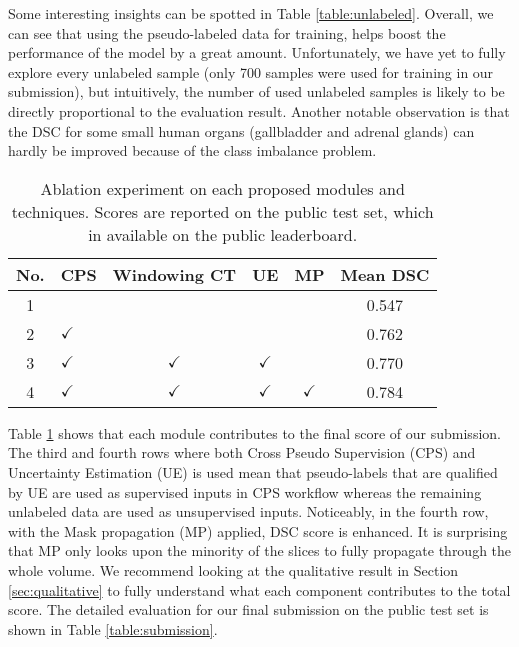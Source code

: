 Some interesting insights can be spotted in Table \ref{table:unlabeled}. Overall, we can see that using the pseudo-labeled data for training, helps boost the performance of the model by a great amount. Unfortunately, we have yet to fully explore every unlabeled sample (only 700 samples were used for training in our submission), but intuitively, the number of used unlabeled samples is likely to be directly proportional to the evaluation result. Another notable observation is that the DSC for some small human organs (gallbladder and adrenal glands) can hardly be improved because of the class imbalance problem. %

\begin{table}[h]
\centering
\caption{Ablation experiment on each proposed modules and techniques. Scores are reported on the public test set, which in available on the public leaderboard.}
\footnotesize
\begin{tabular}{| c | l | c | c | c | c |}
\hline
\textbf{No.} & \textbf{CPS} & \textbf{Windowing CT} & \textbf{UE} & \textbf{MP} & \textbf{Mean DSC} \\ 
\hline
1  &            &  & & & 0.547   \\
2  & $\checkmark$ &            &            & & 0.762   \\
3  & $\checkmark$ & $\checkmark$ & $\checkmark$ & & 0.770   \\
4  & $\checkmark$ & $\checkmark$ & $\checkmark$ & $\checkmark$ & 0.784   \\
\hline
\end{tabular}
\label{table:ablation_study}
\vspace{-2mm}
\end{table}

Table \ref{table:ablation_study} shows that each module contributes to the final score of our submission. The third and fourth rows where both Cross Pseudo Supervision (CPS) and Uncertainty Estimation (UE) is used mean that pseudo-labels that are qualified by UE are used as supervised inputs in CPS workflow whereas the remaining unlabeled data are used as unsupervised inputs. Noticeably, in the fourth row, with the Mask propagation (MP) applied, DSC score is enhanced. It is surprising that MP only looks upon the minority of the slices to fully propagate through the whole volume. We recommend looking at the qualitative result in Section \ref{sec:qualitative} to fully understand what each component contributes to the total score. The detailed evaluation for our final submission on the public test set is shown in Table  \ref{table:submission}. 

